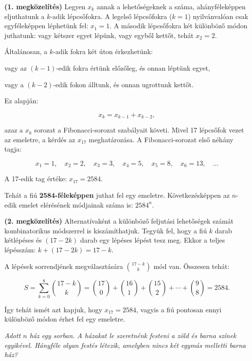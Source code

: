 \begin{solution}
\textbf{(1. megközelítés)} Legyen $x_{k}$ annak a lehetőségeknek
a száma, ahányféleképpen eljuthatunk a $k$-adik lépcsőfokra. A legelső
lépcsőfokra ($k=1$) nyilvánvalóan csak egyféleképpen léphetünk fel:
$x_{1}=1$. A második lépcsőfokra két különböző módon juthatunk: vagy
kétszer egyet lépünk, vagy egyből kettőt, tehát $x_{2}=2$.

Általánosan, a $k$-adik fokra két úton érkezhetünk:

vagy az $(k-1)$-edik fokra értünk előzőleg, és onnan léptünk egyet,

vagy a $(k-2)$-edik fokon álltunk, és onnan ugrottunk kettőt.

Ez alapján:

\[
x_{k}=x_{k-1}+x_{k-2},
\]

azaz a $x_{k}$ sorozat a Fibonacci-sorozat szabályait követi. Mivel
17 lépcsőfok vezet az emeletre, a kérdés az $x_{17}$ meghatározása.
A Fibonacci-sorozat első néhány tagja:

\[
x_{1}=1,\quad x_{2}=2,\quad x_{3}=3,\quad x_{4}=5,\quad x_{5}=8,\quad x_{6}=13,\quad\ldots
\]

A 17-edik tag értéke: $x_{17}=2584$.

Tehát a fiú \textbf{2584-féleképpen} juthat fel egy emeletre. Következésképpen
az $n$-edik emelet elérésének módjainak száma is: $2584^{n}$.

\textbf{(2. megközelítés)} Alternatívaként a különböző feljutási lehetőségek
számát kombinatorikus módszerrel is kiszámíthatjuk. Tegyük fel, hogy
a fiú $k$ darab kétlépéses és $(17-2k)$ darab egy lépéses lépést
tesz meg. Ekkor a teljes lépésszám: $k+(17-2k)=17-k$.

A lépések sorrendjének megválasztására $\binom{17-k}{k}$ mód van.
Összesen tehát:

\[
S=\sum_{k=0}^{8}\binom{17-k}{k}=\binom{17}{0}+\binom{16}{1}+\binom{15}{2}+\cdots+\binom{9}{8}=2584.
\]

Így tehát ismét azt kapjuk, hogy $x_{17}=2584$, vagyis a fiú pontosan
ennyi különböző módon érhet fel egy emeletre. 
\end{solution}
\begin{extraproblem}
\textit{\emph{Adott $n$ ház egy sorban. A házakat le szeretnénk
festeni a zöld és barna színek egyikével. Hányféle olyan festés létezik,
amelyben nincs két egymás melletti barna ház?}}
\end{extraproblem}

